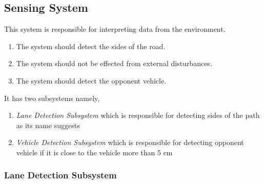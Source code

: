 \documentclass[a4paper,12pt]{article}
\begin{document}
		
		\subsection{Sensing System}
	
				This system is responsible for interpreting data from the environment. 
			\begin{enumerate}
		\item The system should detect the sides of the road.
		\item The system should not be effected from external disturbances.
		\item The system should detect the opponent vehicle.
				\end{enumerate}	
				It has two subsystems namely, 
				
			\begin{enumerate}
				\item \textit{Lane Detection Subsystem} which is responsible for detecting sides of the path as its name suggests
				\item \textit{Vehicle Detection Subsystem} which is responsible for detecting opponent vehicle if it is close to the vehicle more than 5 cm
			\end{enumerate}
	
	
		\subsubsection{Lane Detection Subsystem}
\end{document}

